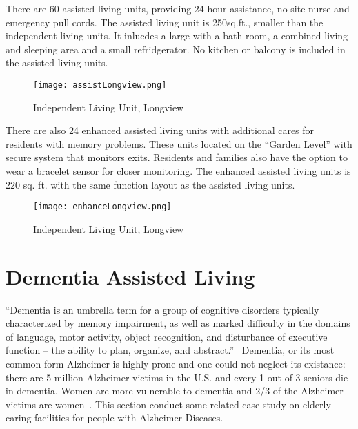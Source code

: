 There are 60 assisted living units, providing 24-hour assistance, no
site nurse and emergency pull cords. The assisted living unit is
250sq.ft., smaller than the independent living units. It inlucdes a
large with a bath room, a combined living and sleeping area and a
small refridgerator. No kitchen or balcony is included in the assisted
living units.
\begin{figure}[htbp]
  \centering
  \texttt{[image: assistLongview.png]}
  \caption[Independent Living Unit, Longview]{Independent Living
    Unit, Longview~\cite{LongviewAssist}}
  \label{fig:assistLongview}
\end{figure}
There are also 24 enhanced assisted living units with additional cares
for residents with memory problems. These units located on the
``Garden Level'' with secure system that monitors exits. Residents
and families also have the option to wear a bracelet sensor for closer
monitoring. The enhanced assisted living units is 220 sq. ft. with the
same function layout as the assisted living units.
\begin{figure}[htbp]
  \centering
  \texttt{[image: enhanceLongview.png]}
  \caption[Independent Living Unit, Longview]{Independent Living
    Unit, Longview~\cite{enhanceLongview}}
  \label{fig:enhanceLongview}
\end{figure}
\section{Dementia Assisted Living}
``Dementia is an umbrella term for a group of cognitive disorders
typically characterized by memory impairment, as well as marked
difficulty in the domains of language, motor activity, object
recognition, and disturbance of executive function – the ability to
plan, organize, and abstract.''~\cite{CDCdementia} Dementia, or its
most common form Alzheimer is highly prone and one could not neglect
its existance: there are 5 million Alzheimer victims in the U.S. and
every 1 out of 3 seniors die in dementia. Women are more vulnerable to
dementia and 2/3 of the Alzheimer victims are
women~\cite{alzorg2014}. This section conduct some related case study
on elderly caring facilities for people with Alzheimer Diseases. 

